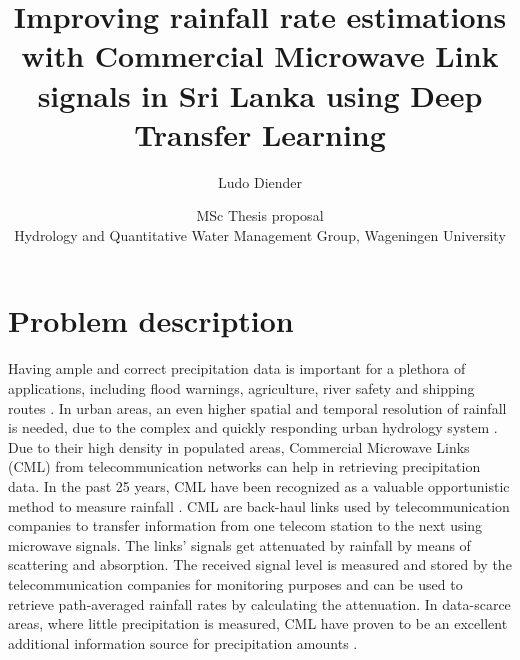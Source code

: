 \documentclass[twocolumn, 10pt, a4paper]{article}
\begin{document}
	\title{\vspace{-1cm}\Huge{Improving rainfall rate estimations with Commercial Microwave Link signals in Sri Lanka using Deep Transfer Learning}}
	\author{\Large{Ludo Diender}}
	\date{\normalsize{MSc Thesis proposal\\
			Hydrology and Quantitative Water Management Group,
			Wageningen University}}
	
	\maketitle
	
	\section{Problem description}
	
	Having ample and correct precipitation data is important for a plethora of applications, including flood warnings, agriculture, river safety and shipping routes \cite{Chwala2019}. In urban areas, an even higher spatial and temporal resolution of rainfall is needed, due to the complex and quickly responding urban hydrology system \cite{Overeem2011}. Due to their high density in populated areas, Commercial Microwave Links (CML) from telecommunication networks can help in retrieving precipitation data. In the past 25 years, CML have been recognized as a valuable opportunistic method to measure rainfall \cite{Leijnse2007, Ruf1996}. CML are back-haul links used by telecommunication companies to transfer information from one telecom station to the next using microwave signals. The links' signals get attenuated by rainfall by means of scattering and absorption. The received signal level is measured and stored by the telecommunication companies for monitoring purposes and can be used to retrieve path-averaged rainfall rates by calculating the attenuation. In data-scarce areas, where little precipitation is measured, CML have proven to be an excellent additional information source for precipitation amounts \cite{Overeem2021,Doumounia2014,Diba2021}.   
	
\end{document}

